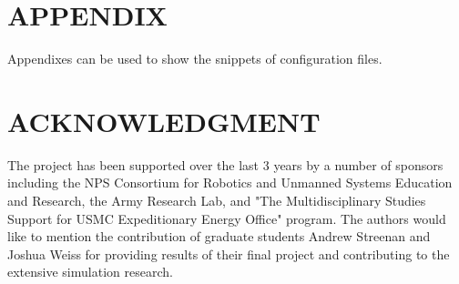 \documentclass[letterpaper, 10 pt, conference]{ieeeconf}  %
\begin{document}
\section*{APPENDIX}

Appendixes can be used to show the snippets of configuration files.

\section*{ACKNOWLEDGMENT}
The project has been supported over the last 3 years by a number of sponsors
including the NPS Consortium for Robotics and Unmanned Systems Education and
Research, the Army Research Lab, and "The Multidisciplinary Studies Support
for USMC Expeditionary Energy Office" program. The authors would like to
mention the contribution of graduate students Andrew Streenan and Joshua
Weiss for providing results of their final project and contributing to the
extensive simulation research.




\end{document}
